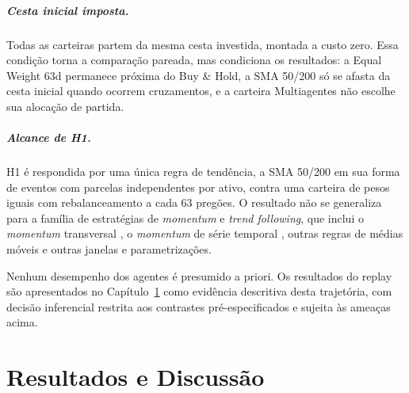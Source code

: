 \documentclass{eic-bcc-tcc}
\begin{document}
\paragraph{Cesta inicial imposta.} Todas as carteiras partem da mesma cesta investida, montada a custo zero. Essa condição torna a comparação pareada, mas condiciona os resultados: a Equal Weight 63d permanece próxima do Buy \& Hold, a SMA 50/200 só se afasta da cesta inicial quando ocorrem cruzamentos, e a carteira Multiagentes não escolhe sua alocação de partida.

\paragraph{Alcance de H1.} H1 é respondida por uma única regra de tendência, a SMA 50/200 em sua forma de eventos com parcelas independentes por ativo, contra uma carteira de pesos iguais com rebalanceamento a cada 63 pregões. O resultado não se generaliza para a família de estratégias de \textit{momentum} e \textit{trend following}, que inclui o \textit{momentum} transversal \citep{JegadeeshTitman1993}, o \textit{momentum} de série temporal \citep{Moskowitz2012}, outras regras de médias móveis \citep{Brock1992} e outras janelas e parametrizações.

Nenhum desempenho dos agentes é presumido a priori. Os resultados do replay são apresentados no Capítulo~\ref{cha:resultados} como evidência descritiva desta trajetória, com decisão inferencial restrita aos contrastes pré-especificados e sujeita às ameaças acima.

\chapter{Resultados e Discussão}
\label{cha:resultados}
\end{document}
